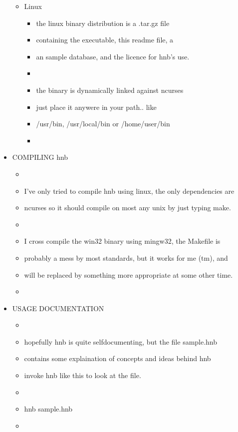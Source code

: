 \documentclass{article}
\begin{document}
\begin{itemize}
\begin{itemize}
		\item Linux
		  \begin{itemize}
			\item the linux binary distribution is a .tar.gz file
			\item containing the executable, this readme file, a
			\item an sample database, and the licence for hnb's use.
			\item 
			\item the binary is dynamically linked against ncurses
			\item just place it anywere in your path.. like
			\item /usr/bin, /usr/local/bin or /home/user/bin
			\item 
		  \end{itemize}

	  \end{itemize}

	\item COMPILING hnb
	  \begin{itemize}
		\item 
		\item I've only tried to compile hnb using linux, the only dependencies are
		\item ncurses so it should compile on most any unix by just typing make.
		\item 
		\item I cross compile the win32 binary using mingw32, the Makefile is
		\item probably a mess by most standards, but it works for me (tm), and
		\item will be replaced by something more appropriate at some other time.
		\item 
	  \end{itemize}

	\item USAGE DOCUMENTATION
	  \begin{itemize}
		\item 
		\item hopefully hnb is quite selfdocumenting, but the file sample.hnb
		\item contains some explaination of concepts and ideas behind hnb
		\item invoke hnb like this to look at the file.
		\item 
		\item hnb sample.hnb
		\item 
	  \end{itemize}


\end{itemize}
\end{document}
